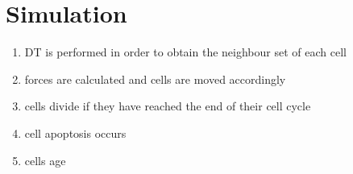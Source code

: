\documentclass[a4paper]{article}
\begin{document}
\section{Simulation}
\begin{enumerate}
	\item DT is performed in order to obtain the neighbour set of each cell
	\item forces are calculated and cells are moved accordingly
	\item cells divide if they have reached the end of their cell cycle
	\item cell apoptosis occurs
	\item cells age
\end{enumerate}
 
 

\end{document}
